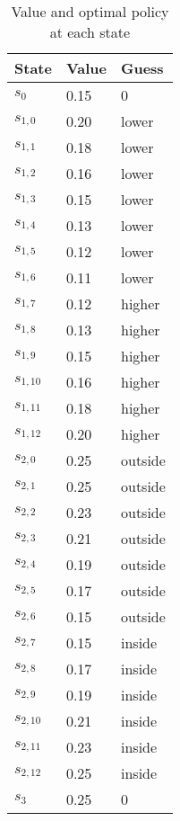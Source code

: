 \begin{table}[h]
\begin{center}
\begin{tabular}{@{}lll@{}}
\toprule
State     & Value               & Guess   \\ \midrule
$s_{0}    $ & 0.15 & 0       \\
$s_{1, 0} $ & 0.20 & lower   \\
$s_{1, 1} $ & 0.18 & lower   \\
$s_{1, 2} $ & 0.16 & lower   \\
$s_{1, 3} $ & 0.15 & lower   \\
$s_{1, 4} $ & 0.13 & lower   \\
$s_{1, 5} $ & 0.12 & lower   \\
$s_{1, 6} $ & 0.11 & lower   \\
$s_{1, 7} $ & 0.12 & higher  \\
$s_{1, 8} $ & 0.13 & higher  \\
$s_{1, 9} $ & 0.15 & higher  \\
$s_{1, 10}$ & 0.16 & higher  \\
$s_{1, 11}$ & 0.18 & higher  \\
$s_{1, 12}$ & 0.20 & higher  \\
$s_{2, 0} $ & 0.25 & outside \\
$s_{2, 1} $ & 0.25 & outside \\
$s_{2, 2} $ & 0.23 & outside \\
$s_{2, 3} $ & 0.21 & outside \\
$s_{2, 4} $ & 0.19 & outside \\
$s_{2, 5} $ & 0.17 & outside \\
$s_{2, 6} $ & 0.15 & outside \\
$s_{2, 7} $ & 0.15 & inside  \\
$s_{2, 8} $ & 0.17 & inside  \\
$s_{2, 9} $ & 0.19 & inside  \\
$s_{2, 10}$ & 0.21 & inside  \\
$s_{2, 11}$ & 0.23 & inside  \\
$s_{2, 12}$ & 0.25 & inside  \\
$s_{3}    $ & 0.25 & 0       \\
\bottomrule
\end{tabular}
\caption{Value and optimal policy at each state}
\label{fig:rltable}
    
\end{center}
\end{table}